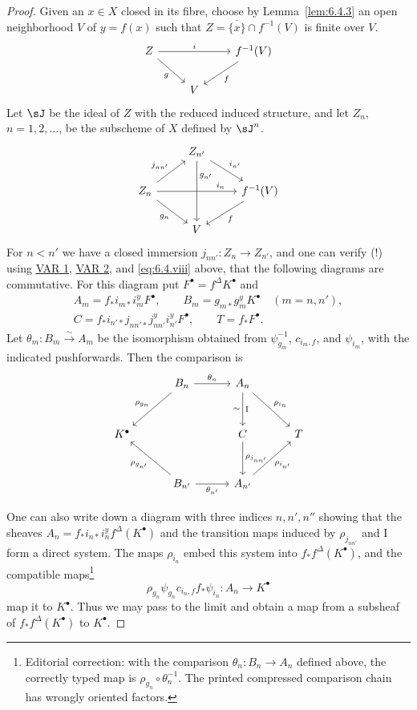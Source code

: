 \begin{proof}
Given an $x\in X$ closed in its fibre, choose by Lemma~\ref{lem:6.4.3} an open neighborhood $V$ of $y=f(x)$ such that $Z = \overline{\{x\}}\cap f^{-1}(V)$ is finite over $V$.
\[
\begin{tikzcd}
Z \ar[rr,"i"] \ar[dr,"g"'] && f^{-1}(V) \ar[dl,"f"] \\
&V
\end{tikzcd}
\]
Let $\sJ$ be the ideal of $Z$ with the reduced induced structure, and let $Z_n$, $n=1,2,\dots$, be the subscheme of $X$ defined by $\sJ^{n}$.
\[
\begin{tikzcd}
& Z_{n'} \ar[rd,"i_{n'}"] \ar[dd,"g_{n'}",near start] & \\
Z_n \ar[ru,"j_{nn'}"] \ar[rr,"i_n",pos=0.8] \ar[rd,"g_n"'] && f^{-1}(V) \ar[ld,"f"] \\
&V&
\end{tikzcd}
\]
For $n<n'$ we have a closed immersion $j_{nn'}\colon Z_n\to Z_{n'}$, and one can verify (!) using \hyperref[var:6.3.1]{VAR 1}, \hyperref[var:6.3.2]{VAR 2}, and \eqref{eq:6.4.viii} above, that the following diagrams are commutative.
For this diagram put $F^\bullet=f^\Delta K^\bullet$ and
\[
\begin{gathered}
A_m=f_*i_{m*}i_m^y F^\bullet,\qquad B_m=g_{m*}g_m^y K^\bullet\quad(m=n,n'),\\
C=f_*i_{n'*}j_{nn'*}j_{nn'}^y i_{n'}^y F^\bullet,\qquad T=f_*F^\bullet.
\end{gathered}
\]
Let $\theta_m\colon B_m\xrightarrow{\sim}A_m$ be the isomorphism obtained from $\psi_{g_m}^{-1}$, $c_{i_m,f}$, and $\psi_{i_m}$, with the indicated pushforwards. Then the comparison is
\[
\begin{tikzcd}[column sep=3em,row sep=3em]
& B_n \ar[r,"\theta_n"] \ar[dl,"\rho_{g_n}"'] & A_n \ar[d,"\mathrm{I}","\sim"'] \ar[dr,"\rho_{i_n}"] & \\
K^\bullet && C \ar[d,"\rho_{j_{nn'}}"] & T \\
& B_{n'} \ar[r,"\theta_{n'}"'] \ar[ul,"\rho_{g_{n'}}"] & A_{n'} \ar[ur,"\rho_{i_{n'}}"'] &
\end{tikzcd}
\]

\par\endgroup

One can also write down a diagram with three indices $n,n',n''$ showing that the sheaves $A_n=f_*i_{n*}i_n^y f^\Delta(K^\bullet)$ and the transition maps induced by $\rho_{j_{nn'}}$ and I form a direct system. The maps $\rho_{i_n}$ embed this system into $f_*f^\Delta(K^\bullet)$, and the compatible maps\footnote{Editorial correction: with the comparison $\theta_n:B_n\to A_n$ defined above, the correctly typed map is $\rho_{g_n}\circ\theta_n^{-1}$. The printed compressed comparison chain has wrongly oriented factors.}
\[
\rho_{g_n}\psi_{g_n}c_{i_n,f}f_*\psi_{i_n}\colon A_n\longrightarrow K^\bullet
\]
map it to $K^\bullet$. Thus we may pass to the limit and obtain a map from a subsheaf of $f_*f^\Delta(K^\bullet)$ to $K^\bullet$.


\end{proof}

